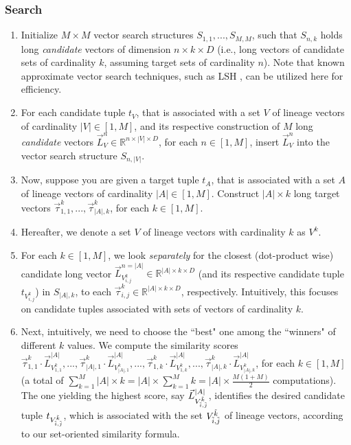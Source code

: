\subsubsection{Search}
\begin{enumerate}
    \item Initialize $M \times M$ vector search structures $S_{1,1}, ..., S_{M,M}$, such that $S_{n, k}$ holds long \textit{candidate} vectors of dimension $n \times k \times D$ (i.e., long vectors of candidate sets of cardinality $k$, assuming target sets of cardinality $n$). Note that known approximate vector search techniques, such as LSH \cite{lsh}, can be utilized here for efficiency.
    \item For each candidate tuple $t_V$, that is associated with a set $V$ of lineage vectors of cardinality $|V| \in [1, M]$, and its respective construction of $M$ long \textit{candidate} vectors $\vec{L}_V^n \in \mathbb{R}^{n \times |V| \times D}$, for each $n \in [1, M]$, insert $\vec{L}_V^n$ into the vector search structure $S_{n, |V|}$.
    \item Now, suppose you are given a target tuple $t_A$, that is associated with a set $A$ of lineage vectors of cardinality $|A| \in [1, M]$. Construct $|A| \times k$ long target vectors $\vec{\tau}_{1, 1}^k, ..., \vec{\tau}_{|A|, k}^k$, for each $k \in [1, M]$.
    \item Hereafter, we denote a set $V$ of lineage vectors with cardinality $k$ as $V^k$.
    \item For each $k \in [1, M]$, we look \textit{separately} for the closest (dot-product wise) candidate long vector $\vec{L}_{V_{i, j}^k}^{n=|A|} \in \mathbb{R}^{|A| \times k \times D}$ (and its respective candidate tuple $t_{V_{i, j}^k}$) in $S_{|A|, k}$, to each $\vec{\tau}_{i, j}^k \in \mathbb{R}^{|A| \times k \times D}$, respectively. 
    Intuitively, this focuses on candidate tuples associated with sets of vectors of cardinality $k$.
    \item 
    Next, intuitively, we need to choose the ``best" one among the ``winners" of different $k$ values.
    We compute the similarity scores $\vec{\tau}_{1, 1}^k \cdot \vec{L}_{V_{1, 1}^k}^{|A|}, ..., \vec{\tau}_{|A|, 1}^k \cdot \vec{L}_{V_{|A|, 1}^k}^{|A|}, ..., \vec{\tau}_{1, k}^k \cdot \vec{L}_{V_{1, k}^k}^{|A|}, ..., \vec{\tau}_{|A|, k}^k \cdot \vec{L}_{V_{|A|, k}^k}^{|A|}$, for each $k \in [1, M]$ (a total of $\sum_{k=1}^M |A| \times k = |A| \times \sum_{k=1}^M k = |A| \times \frac{M(1 + M)}{2}$ computations). The one yielding the highest score, say $\vec{L}_{V_{{\Tilde{i}, {\Tilde{j}}}}^{\Tilde{k}}}^{|A|}$, identifies the desired candidate tuple $t_{V_{{\Tilde{i}, {\Tilde{j}}}}^{\Tilde{k}}}$, which is associated with the set $V_{{\Tilde{i}, {\Tilde{j}}}}^{\Tilde{k}}$ of lineage vectors, according to our set-oriented similarity formula.
\end{enumerate}